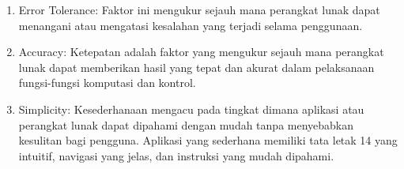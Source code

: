 \begin{enumerate}
		\begin{enumerate}[label=(\alph*)]
				\item Error Tolerance: Faktor ini mengukur sejauh mana perangkat lunak dapat menangani atau mengatasi kesalahan yang terjadi selama penggunaan. 
				\item Accuracy: Ketepatan adalah faktor yang mengukur sejauh mana perangkat lunak dapat memberikan hasil yang tepat dan akurat dalam pelaksanaan fungsi-fungsi komputasi dan kontrol.
				\item Simplicity: Kesederhanaan mengacu pada tingkat dimana aplikasi atau perangkat lunak dapat dipahami dengan mudah tanpa menyebabkan kesulitan bagi pengguna. Aplikasi yang sederhana memiliki tata letak 14 yang intuitif, navigasi yang jelas, dan instruksi yang mudah dipahami. 
		\end{enumerate}
		

\end{enumerate}
